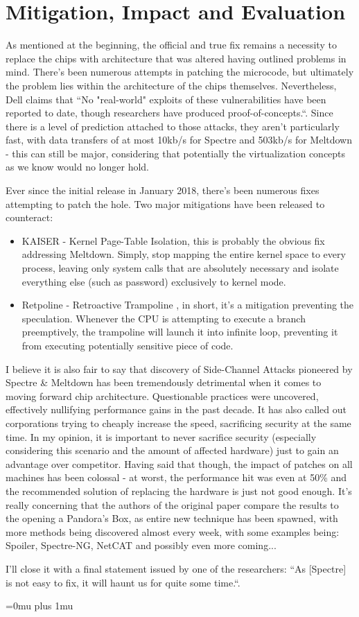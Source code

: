 \documentclass{article}
\begin{document}
\section{Mitigation, Impact and Evaluation}
As mentioned at the beginning, the official and true fix remains a necessity to replace the chips with architecture that was altered having outlined problems in mind. There's been numerous attempts in patching the microcode, but ultimately the problem lies within the architecture of the chips themselves. Nevertheless, Dell claims that ``No "real-world" exploits of these vulnerabilities have been reported to date, though researchers have produced proof-of-concepts.``\cite{dell}. Since there is a level of prediction attached to those attacks, they aren't particularly fast, with data transfers of at most 10kb/s for Spectre and 503kb/s for Meltdown \cite{kocher2018spectre}\cite{lipp2018meltdown} - this can still be major, considering that potentially the virtualization concepts as we know would no longer hold.

Ever since the initial release in January 2018, there's been numerous fixes attempting to patch the hole. Two major mitigations have been released to counteract:
\begin{itemize}
  \item KAISER \cite{lipp2018meltdown} - Kernel Page-Table Isolation, this is probably the obvious fix addressing Meltdown. Simply, stop mapping the entire kernel space to every process, leaving only system calls that are absolutely necessary and isolate everything else (such as password) exclusively to kernel mode.
  \item Retpoline - Retroactive Trampoline \cite{turner2018retpoline}, in short, it's a mitigation preventing the speculation. Whenever the CPU is attempting to execute a branch preemptively, the trampoline will launch it into infinite loop, preventing it from executing potentially sensitive piece of code.
\end{itemize}

I believe it is also fair to say that discovery of Side-Channel Attacks pioneered by Spectre \& Meltdown has been tremendously detrimental when it comes to moving forward chip architecture. Questionable practices were uncovered, effectively nullifying performance gains in the past decade. It has also called out corporations trying to cheaply increase the speed, sacrificing security at the same time. In my opinion, it is important to never sacrifice security (especially considering this scenario and the amount of affected hardware) just to gain an advantage over competitor. Having said that though, the impact of patches on all machines has been colossal - at worst, the performance hit was even at 50\% \cite{prout2018measuring} and the recommended solution of replacing the hardware is just not good enough. It's really concerning that the authors of the original paper compare the results to the opening a Pandora's Box, as entire new technique has been spawned, with more methods being discovered almost every week, with some examples being: Spoiler, Spectre-NG, NetCAT and possibly even more coming...

I'll close it with a final statement issued by one of the researchers: ``As [Spectre] is not easy to fix, it will haunt us for quite some time.``. 

\Urlmuskip=0mu plus 1mu\relax


 
\end{document}
